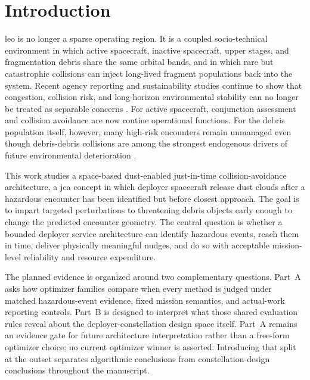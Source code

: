 \chapter{Introduction} \label{ch:intro}
\gls{leo} is no longer a sparse operating region. It is a coupled socio-technical environment in which active spacecraft, inactive spacecraft, upper stages, and fragmentation debris share the same orbital bands, and in which rare but catastrophic collisions can inject long-lived fragment populations back into the system. Recent agency reporting and sustainability studies continue to show that congestion, collision risk, and long-horizon environmental stability can no longer be treated as separable concerns \cite{ESAEnvironment2025,Muciaccia2024LEOCapacity,commercialspace}. For active spacecraft, conjunction assessment and collision avoidance are now routine operational functions. For the debris population itself, however, many high-risk encounters remain unmanaged even though debris-debris collisions are among the strongest endogenous drivers of future environmental deterioration \cite{Kessler1978,Wagner2024ADR}.

This work studies a space-based dust-enabled just-in-time collision-avoidance architecture, a \gls{jca} concept in which deployer spacecraft release dust clouds after a hazardous encounter has been identified but before closest approach. The goal is to impart targeted perturbations to threatening debris objects early enough to change the predicted encounter geometry. The central question is whether a bounded deployer service architecture can identify hazardous events, reach them in time, deliver physically meaningful nudges, and do so with acceptable mission-level reliability and resource expenditure.

The planned evidence is organized around two complementary questions. Part~A asks how optimizer families compare when every method is judged under matched hazardous-event evidence, fixed mission semantics, and actual-work reporting controls. Part~B is designed to interpret what those shared evaluation rules reveal about the deployer-constellation design space itself. Part~A remains an evidence gate for future architecture interpretation rather than a free-form optimizer choice; no current optimizer winner is asserted. Introducing that split at the outset separates algorithmic conclusions from constellation-design conclusions throughout the manuscript.

